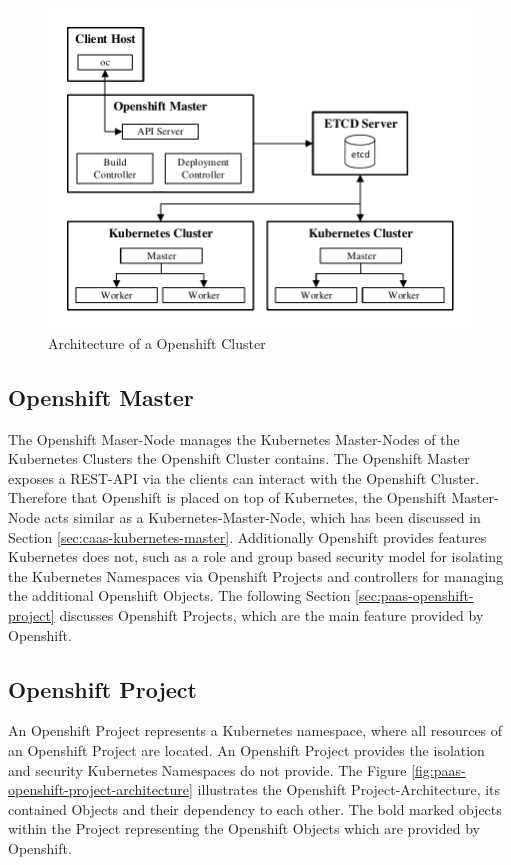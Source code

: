 \newpage

\begin{figure}[htbp]
	\centering
	\includegraphics[scale=1]{images/openshift-kubernetes-cluster-architecture.pdf}
	\caption{Architecture of a Openshift Cluster}
	\label{fig:paas-openshift-kubernetes-cluster-architecture}
\end{figure} 

\subsection{Openshift Master}
\label{sec:paas-openshift-master}
The Openshift Maser-Node manages the Kubernetes Master-Nodes of the Kubernetes Clusters the Openshift Cluster contains. The Openshift Master exposes a REST-API via the clients can interact with the Openshift Cluster. Therefore that Openshift is placed on top of Kubernetes, the Openshift Master-Node acts similar as a Kubernetes-Master-Node, which has been discussed in Section \vref{sec:caas-kubernetes-master}. Additionally Openshift provides features Kubernetes does not, such as a role and group based security model for isolating the Kubernetes Namespaces via Openshift Projects and controllers for managing the additional Openshift Objects. The following Section \vref{sec:paas-openshift-project} discusses Openshift Projects, which are the main feature provided by Openshift.

\subsection{Openshift Project}
\label{sec:paas-openshift-project}
An Openshift Project represents a Kubernetes namespace, where all resources of an Openshift Project are located. An Openshift Project provides the isolation and security Kubernetes Namespaces do not provide. The Figure \vref{fig:paas-openshift-project-architecture} illustrates the Openshift Project-Architecture, its contained Objects and their dependency to each other. The bold marked objects within the Project representing the Openshift Objects which are provided by Openshift.

